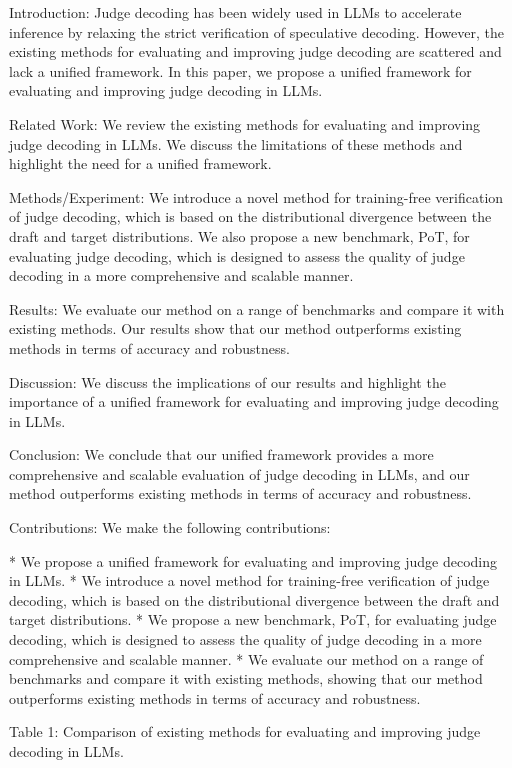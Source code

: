 Introduction:
Judge decoding has been widely used in LLMs to accelerate inference by relaxing the strict verification of speculative decoding. However, the existing methods for evaluating and improving judge decoding are scattered and lack a unified framework. In this paper, we propose a unified framework for evaluating and improving judge decoding in LLMs.

Related Work:
We review the existing methods for evaluating and improving judge decoding in LLMs. We discuss the limitations of these methods and highlight the need for a unified framework.

Methods/Experiment:
We introduce a novel method for training-free verification of judge decoding, which is based on the distributional divergence between the draft and target distributions. We also propose a new benchmark, PoT, for evaluating judge decoding, which is designed to assess the quality of judge decoding in a more comprehensive and scalable manner.

Results:
We evaluate our method on a range of benchmarks and compare it with existing methods. Our results show that our method outperforms existing methods in terms of accuracy and robustness.

Discussion:
We discuss the implications of our results and highlight the importance of a unified framework for evaluating and improving judge decoding in LLMs.

Conclusion:
We conclude that our unified framework provides a more comprehensive and scalable evaluation of judge decoding in LLMs, and our method outperforms existing methods in terms of accuracy and robustness.

Contributions:
We make the following contributions:

*   We propose a unified framework for evaluating and improving judge decoding in LLMs.
*   We introduce a novel method for training-free verification of judge decoding, which is based on the distributional divergence between the draft and target distributions.
*   We propose a new benchmark, PoT, for evaluating judge decoding, which is designed to assess the quality of judge decoding in a more comprehensive and scalable manner.
*   We evaluate our method on a range of benchmarks and compare it with existing methods, showing that our method outperforms existing methods in terms of accuracy and robustness.

Table 1: Comparison of existing methods for evaluating and improving judge decoding in LLMs.

